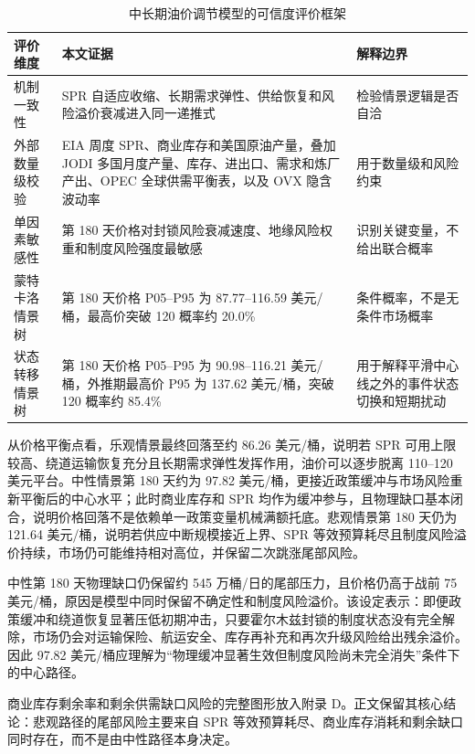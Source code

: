\begin{table}[!htbp]
\centering
\caption{中长期油价调节模型的可信度评价框架}
\begin{tabularx}{\linewidth}{lX X}
\toprule
评价维度 & 本文证据 & 解释边界 \\
\midrule
机制一致性 & SPR 自适应收缩、长期需求弹性、供给恢复和风险溢价衰减进入同一递推式 & 检验情景逻辑是否自洽 \\
外部数量级校验 & EIA 周度 SPR、商业库存和美国原油产量，叠加 JODI 多国月度产量、库存、进出口、需求和炼厂产出、OPEC 全球供需平衡表，以及 OVX 隐含波动率 & 用于数量级和风险约束 \\
单因素敏感性 & 第 180 天价格对封锁风险衰减速度、地缘风险权重和制度风险强度最敏感 & 识别关键变量，不给出联合概率 \\
蒙特卡洛情景树 & 第 180 天价格 P05--P95 为 87.77--116.59 美元/桶，最高价突破 120 概率约 20.0\% & 条件概率，不是无条件市场概率 \\
状态转移情景树 & 第 180 天价格 P05--P95 为 90.98--116.21 美元/桶，外推期最高价 P95 为 137.62 美元/桶，突破 120 概率约 85.4\% & 用于解释平滑中心线之外的事件状态切换和短期扰动 \\
\bottomrule
\end{tabularx}
\end{table}

\FloatBarrier

从价格平衡点看，乐观情景最终回落至约 86.26 美元/桶，说明若 SPR 可用上限较高、绕道运输恢复充分且长期需求弹性发挥作用，油价可以逐步脱离 110--120 美元平台。中性情景第 180 天约为 97.82 美元/桶，更接近政策缓冲与市场风险重新平衡后的中心水平；此时商业库存和 SPR 均作为缓冲参与，且物理缺口基本闭合，说明价格回落不是依赖单一政策变量机械满额托底。悲观情景第 180 天仍为 121.64 美元/桶，说明若供应中断规模接近上界、SPR 等效预算耗尽且制度风险溢价持续，市场仍可能维持相对高位，并保留二次跳涨尾部风险。

中性第 180 天物理缺口仍保留约 545 万桶/日的尾部压力，且价格仍高于战前 75 美元/桶，原因是模型中同时保留不确定性和制度风险溢价。该设定表示：即便政策缓冲和绕道恢复显著压低初期冲击，只要霍尔木兹封锁的制度状态没有完全解除，市场仍会对运输保险、航运安全、库存再补充和再次升级风险给出残余溢价。因此 97.82 美元/桶应理解为“物理缓冲显著生效但制度风险尚未完全消失”条件下的中心路径。

商业库存剩余率和剩余供需缺口风险的完整图形放入附录 D。正文保留其核心结论：悲观路径的尾部风险主要来自 SPR 等效预算耗尽、商业库存消耗和剩余缺口同时存在，而不是由中性路径本身决定。

